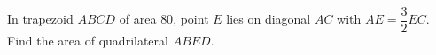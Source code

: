 In trapezoid $ABCD$ of area $80$, point $E$ lies on diagonal $AC$ with $AE=\dfrac{3}{2}EC$. Find the area of quadrilateral $ABED$.
